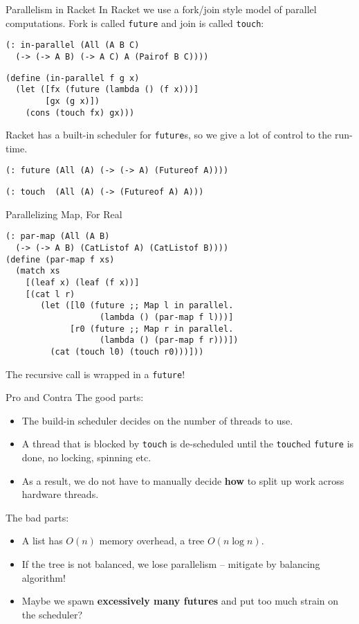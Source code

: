 \documentclass{beamer}
\begin{document}
\begin{frame}[fragile]{Parallelism in Racket}
In Racket we use a fork/join style model of parallel computations. Fork is called \lstinline{future} and join is called \lstinline{touch}:

\begin{lstlisting}
(: in-parallel (All (A B C)
  (-> (-> A B) (-> A C) A (Pairof B C))))
\end{lstlisting}
\pause{}
\begin{lstlisting}
(define (in-parallel f g x)
  (let ([fx (future (lambda () (f x)))]
        [gx (g x)])
    (cons (touch fx) gx)))
\end{lstlisting}

\pause{} \vspace{.5cm}

Racket has a built-in scheduler for \lstinline{future}s, so we give a lot of control to the run-time.

\lstinline{(: future (All (A) (-> (-> A) (Futureof A))))}

\lstinline{(: touch  (All (A) (-> (Futureof A) A)))}
\end{frame}

\begin{frame}[fragile]{Parallelizing Map, For Real}
\begin{lstlisting}
(: par-map (All (A B)
  (-> (-> A B) (CatListof A) (CatListof B))))
(define (par-map f xs)
  (match xs
    [(leaf x) (leaf (f x))]
    [(cat l r)
       (let ([l0 (future ;; Map l in parallel.
                   (lambda () (par-map f l)))]
             [r0 (future ;; Map r in parallel.
                   (lambda () (par-map f r)))])
         (cat (touch l0) (touch r0)))]))
\end{lstlisting}

The recursive call is wrapped in a \lstinline{future}!
\end{frame}

\begin{frame}{Pro and Contra}
  The good parts:

  \begin{itemize}
  \item The build-in scheduler decides on the number of threads to use.
  \item A thread that is blocked by \lstinline{touch} is de-scheduled until the \lstinline{touch}ed \lstinline{future} is done, no locking, spinning etc.
  \item As a result, we do not have to manually decide \textbf{how} to split up work across hardware threads.
  \end{itemize}

  \pause{}

  The bad parts:
  \begin{itemize}
  \item A list has $O(n)$ memory overhead, a tree $O(n \log n)$.
  \item If the tree is not balanced, we lose parallelism -- mitigate by balancing algorithm!
  \item Maybe we spawn \textbf{excessively many futures} and put too much strain on the scheduler?
  \end{itemize}
\end{frame}
\end{document}
